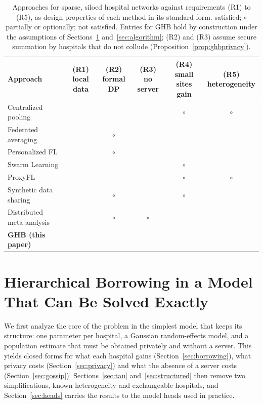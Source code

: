 \documentclass[acmsmall,screen,review]{acmart}
\newcommand{\yes}{\textcolor{famC}{\ding{51}}}
\newcommand{\no}{\textcolor{famO}{\ding{55}}}
\newcommand{\partly}{\textcolor{famT}{$\boldsymbol{\circ}$}}
\theoremstyle{acmdefinition}
\begin{document}
\begin{table}[t]
\caption{Approaches for sparse, siloed hospital networks against requirements (R1) to (R5), as design properties of each method in its standard form. \yes{} satisfied; \partly{} partially or optionally; \no{} not satisfied. Entries for GHB hold by construction under the assumptions of Sections~\ref{sec:model} and~\ref{sec:algorithm}; (R2) and (R3) assume secure summation by hospitals that do not collude (Proposition~\ref{prop:ghbprivacy}).}
\label{tab:approaches}
\small
\begin{tabularx}{\linewidth}{@{}>{\raggedright\arraybackslash}Xccccc@{}}
\toprule
Approach & \shortstack{(R1)\\local data} & \shortstack{(R2)\\formal DP} & \shortstack{(R3)\\no server} & \shortstack{(R4)\\small sites gain} & \shortstack{(R5)\\heterogeneity}\\
\midrule
Centralized pooling & \no & \no & \no & \partly & \partly\\
Federated averaging \cite{mcmahan2017communication} & \yes & \partly & \no & \no & \no\\
Personalized FL \cite{collins2021exploiting,li2021ditto} & \yes & \partly & \no & \yes & \yes\\
Swarm Learning \cite{warnatherresthal2021swarm} & \yes & \no & \yes & \partly & \no\\
ProxyFL \cite{kalra2023decentralized} & \yes & \yes & \yes & \partly & \partly\\
Synthetic data sharing \cite{jordon2019pate} & \yes & \partly & \yes & \partly & \no\\
Distributed meta-analysis \cite{dersimonian1986meta,duan2020learning} & \yes & \partly & \partly & \yes & \yes\\
\textbf{GHB (this paper)} & \yes & \yes & \yes & \yes & \yes\\
\bottomrule
\end{tabularx}
\end{table}

\section{Hierarchical Borrowing in a Model That Can Be Solved Exactly}\label{sec:model}

We first analyze the core of the problem in the simplest model that keeps its structure: one parameter per hospital, a Gaussian random-effects model, and a population estimate that must be obtained privately and without a server. This yields closed forms for what each hospital gains (Section~\ref{sec:borrowing}), what privacy costs (Section~\ref{sec:privacy}) and what the absence of a server costs (Section~\ref{sec:gossip}). Sections~\ref{sec:tau} and~\ref{sec:structured} then remove two simplifications, known heterogeneity and exchangeable hospitals, and Section~\ref{sec:heads} carries the results to the model heads used in practice.
\end{document}
